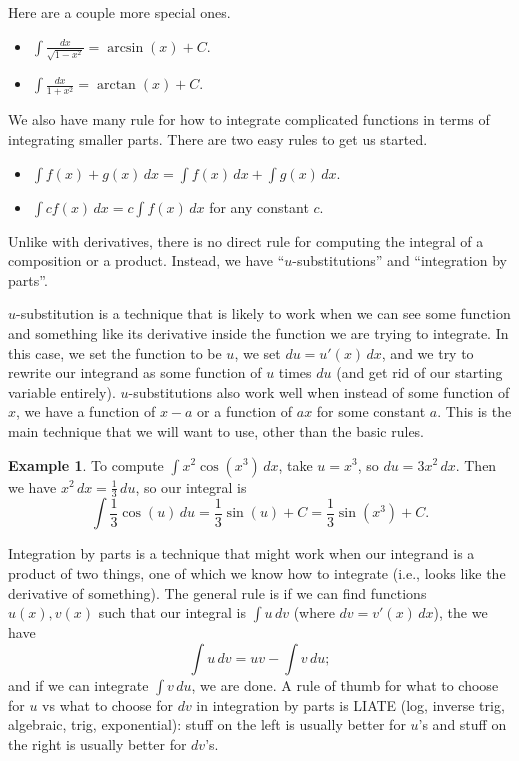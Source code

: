 \documentclass[12pt]{amsart}
\numberwithin{equation}{section}
\theoremstyle{plain} %
\theoremstyle{definition}
\newtheorem{ex}[equation]{Example}
\theoremstyle{remark}
\begin{document}
Here are a couple more special ones.

\begin{itemize}
\item $\int \frac{dx}{\sqrt{1-x^2}} = \arcsin(x) + C$.
\item $\int \frac{dx}{1 + x^2} = \arctan(x) + C$.
\end{itemize}

We also have many rule for how to integrate complicated functions in terms of integrating smaller parts. There are two easy rules to get us started.

\begin{itemize}
\item $\int f(x) + g(x) \, dx = \int f(x)  \, dx + \int g(x) \, dx$.
\item $ \int c f(x) \, dx = c \int f(x)  \, dx$ for any constant $c$.
\end{itemize}

Unlike with derivatives, there is no direct rule for computing the integral of a composition or a product. Instead, we have ``$u$-substitutions'' and ``integration by parts''. 

$u$-substitution is a technique that is likely to work when we can see some function and something like its derivative inside the function we are trying to integrate. In this case, we set the function to be $u$, we set $du= u'(x) \, dx$, and we try to rewrite our integrand as some function of $u$  times $du$ (and get rid of our starting variable entirely). $u$-substitutions also work well when instead of some function of $x$, we have a function of $x-a$ or a function of $ax$ for some constant $a$.
This is the main technique that we will want to use, other than the basic rules.

\begin{ex}
To compute $\int x^2 \cos(x^3) \, dx$, take $u=x^3$, so ${du=3x^2 \, dx}$. Then we have ${x^2 \, dx = \frac13 \, du}$, so our integral is \[\int \frac13 \cos(u)\,  du = {\frac13 \sin(u) + C}= \frac13 \sin(x^3) +C.\]
\end{ex}


Integration by parts is a technique that might work when our integrand is a product of two things, one of which we know how to integrate (i.e., looks like the derivative of something). The general rule is if we can find functions $u(x), v(x)$ such that our integral is $\int u \, dv$ (where $dv = v'(x) \, dx$), the we have
\[ \int  u \, dv = uv -  \int v \, du;\]
and if we can integrate $ \int v \, du$, we are done. A rule of thumb for what to choose for $u$ vs what to choose for $dv$ in integration by parts is LIATE (log, inverse trig, algebraic, trig, exponential): stuff on the left is usually better for $u$'s and stuff on the right is usually better for $dv$'s.
\end{document}
